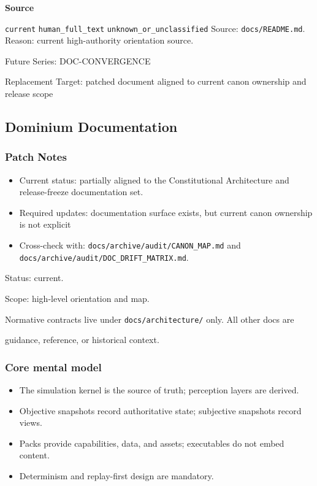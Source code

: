 \documentclass[9pt,a4paper,openany]{book}
\newcommand{\vonecallout}[3]{\par\medskip\noindent\begingroup\setlength{\fboxsep}{7pt}\colorbox{DomCalloutBg}{\parbox{0.94\linewidth}{\textbf{\textcolor{#1}{#2}}\par #3}}\endgroup\par\medskip}
\begin{document}
\vonecallout{DomSlate}{Source}{\texttt{current} \texttt{human\_\allowbreak{}full\_\allowbreak{}text} \texttt{unknown\_\allowbreak{}or\_\allowbreak{}unclassified} Source: \texttt{docs/\allowbreak{}README.\allowbreak{}md}.\allowbreak{} Reason: current high-\allowbreak{}authority orientation source.\allowbreak{}}

Future Series: DOC-\allowbreak{}CONVERGENCE

Replacement Target: patched document aligned to current canon ownership and release scope


\subsection{Dominium Documentation}

\subsubsection{Patch Notes}

\begin{itemize}
\item Current status: partially aligned to the Constitutional Architecture and release-\allowbreak{}freeze documentation set.\allowbreak{}
\item Required updates: documentation surface exists, but current canon ownership is not explicit
\item Cross-\allowbreak{}check with: \texttt{docs/\allowbreak{}archive/\allowbreak{}audit/\allowbreak{}CANON\_\allowbreak{}MAP.\allowbreak{}md} and \texttt{docs/\allowbreak{}archive/\allowbreak{}audit/\allowbreak{}DOC\_\allowbreak{}DRIFT\_\allowbreak{}MATRIX.\allowbreak{}md}.\allowbreak{}
\end{itemize}


Status: current.\allowbreak{}

Scope: high-\allowbreak{}level orientation and map.\allowbreak{}


Normative contracts live under \texttt{docs/\allowbreak{}architecture/\allowbreak{}} only.\allowbreak{} All other docs are

guidance, reference, or historical context.\allowbreak{}


\subsubsection{Core mental model}

\begin{itemize}
\item The simulation kernel is the source of truth; perception layers are derived.\allowbreak{}
\item Objective snapshots record authoritative state; subjective snapshots record views.\allowbreak{}
\item Packs provide capabilities, data, and assets; executables do not embed content.\allowbreak{}
\item Determinism and replay-\allowbreak{}first design are mandatory.\allowbreak{}
\end{itemize}
\end{document}
